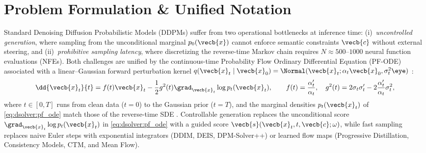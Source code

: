 \documentclass[../../../../master.tex]{subfiles}
\begin{document}

\section{Problem Formulation \& Unified Notation}
\label{sec:dsolver:formulation}

Standard Denoising Diffusion Probabilistic Models (DDPMs) suffer from two operational bottlenecks at inference time: (i)~\emph{uncontrolled generation}, where sampling from the unconditional marginal $p_0(\vecb{x})$ cannot enforce semantic constraints $\vecb{c}$ without external steering, and (ii)~\emph{prohibitive sampling latency}, where discretizing the reverse-time Markov chain requires $N \approx 500$--$1000$ neural function evaluations (NFEs). Both challenges are unified by the continuous-time Probability Flow Ordinary Differential Equation (PF-ODE) associated with a linear--Gaussian forward perturbation kernel $q(\vecb{x}_t \mid \vecb{x}_0) = \Normal(\vecb{x}_t; \alpha_t \vecb{x}_0, \sigma_t^2 \eye)$ :
\begin{equation}
  \label{eq:dsolver:pf_ode}
  \dd{\vecb{x}_t}{t} = f(t)\vecb{x}_t - \frac{1}{2} g^2(t) \grad_{\vecb{x}_t} \log p_t(\vecb{x}_t),
  \qquad f(t) = \frac{\alpha'_t}{\alpha_t}, \quad g^2(t) = 2\sigma_t\sigma'_t - 2\frac{\alpha'_t}{\alpha_t}\sigma_t^2,
\end{equation}
where $t \in [0, T]$ runs from clean data ($t=0$) to the Gaussian prior ($t=T$), and the marginal densities $p_t(\vecb{x}_t)$ of \eqref{eq:dsolver:pf_ode} match those of the reverse-time SDE . Controllable generation replaces the unconditional score $\grad_{\vecb{x}_t}\log p_t(\vecb{x}_t)$ in \eqref{eq:dsolver:pf_ode} with a guided score $\vecb{s}(\vecb{x}_t, t, \vecb{c}; \omega)$, while fast sampling replaces naive Euler steps with exponential integrators (DDIM, DEIS, DPM-Solver++) or learned flow maps (Progressive Distillation, Consistency Models, CTM, and Mean Flow).
\end{document}
